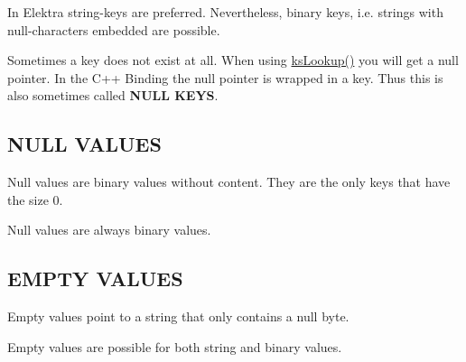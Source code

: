 In Elektra string-\/keys are preferred. Nevertheless, binary keys, i.\+e. strings with null-\/characters embedded are possible.

Sometimes a key does not exist at all. When using \hyperlink{group__keyset_gaa34fc43a081e6b01e4120daa6c112004}{ks\+Lookup()} you will get a null pointer. In the C++ Binding the null pointer is wrapped in a key. Thus this is also sometimes called {\bfseries N\+U\+L\+L K\+E\+Y\+S}.

\subsection*{N\+U\+L\+L V\+A\+L\+U\+E\+S}

Null values are binary values without content. They are the only keys that have the size 0.

Null values are always binary values.

\subsection*{E\+M\+P\+T\+Y V\+A\+L\+U\+E\+S}

Empty values point to a string that only contains a null byte.

Empty values are possible for both string and binary values. 
